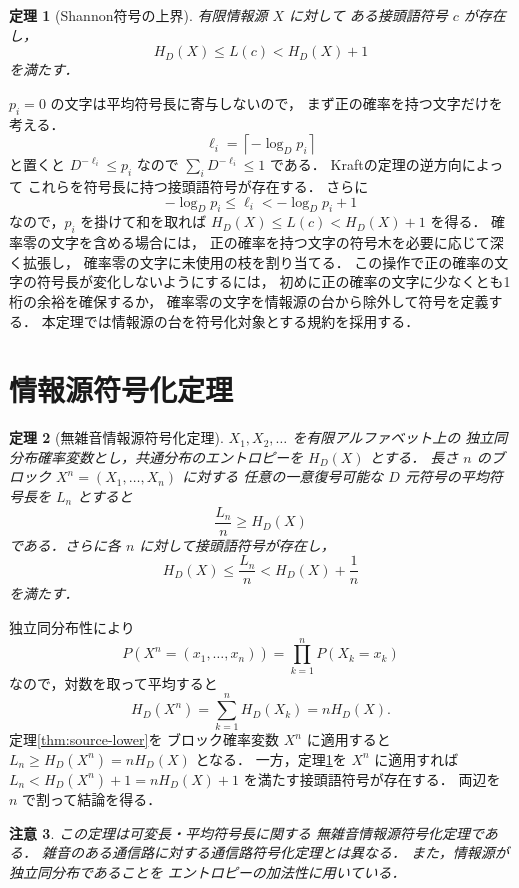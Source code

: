 \documentclass[a5paper,10pt,onecolumn]{jsarticle}
\makeatletter
\theoremstyle{mathnotetheorem}
\newtheorem{theorem}{定理}[section]
\newtheorem{remark}[theorem]{注意}
\renewcommand{\proofname}{証明}
\renewenvironment{proof}[1][\proofname]{%
  \par\pushQED{\qed}\normalfont\topsep4\p@\@plus2\p@\relax
  \trivlist\item[\hskip\labelsep\bfseries #1]\ignorespaces
}{\popQED\endtrivlist\@endpefalse}
\makeatother
\begin{document}
\begin{theorem}[Shannon符号の上界]\label{thm:shannon-upper}
有限情報源 $X$ に対して
ある接頭語符号 $c$ が存在し，
\[
 H_D(X)\le L(c)<H_D(X)+1
\]
を満たす．
\end{theorem}
\begin{proof}
$p_i=0$ の文字は平均符号長に寄与しないので，
まず正の確率を持つ文字だけを考える．
\[
 \ell_i=\left\lceil-\log_Dp_i\right\rceil
\]
と置くと
$D^{-\ell_i}\le p_i$ なので
$\sum_iD^{-\ell_i}\le1$ である．
Kraftの定理の逆方向によって
これらを符号長に持つ接頭語符号が存在する．
さらに
\[
 -\log_Dp_i\le\ell_i<-\log_Dp_i+1
\]
なので，$p_i$ を掛けて和を取れば
$H_D(X)\le L(c)<H_D(X)+1$ を得る．
確率零の文字を含める場合には，
正の確率を持つ文字の符号木を必要に応じて深く拡張し，
確率零の文字に未使用の枝を割り当てる．
この操作で正の確率の文字の符号長が変化しないようにするには，
初めに正の確率の文字に少なくとも1桁の余裕を確保するか，
確率零の文字を情報源の台から除外して符号を定義する．
本定理では情報源の台を符号化対象とする規約を採用する．
\end{proof}

\section{情報源符号化定理}

\begin{theorem}[無雑音情報源符号化定理]\label{thm:source-coding}
$X_1,X_2,\dots$ を有限アルファベット上の
独立同分布確率変数とし，共通分布のエントロピーを
$H_D(X)$ とする．
長さ $n$ のブロック $X^n=(X_1,\dots,X_n)$ に対する
任意の一意復号可能な $D$ 元符号の平均符号長を $L_n$ とすると
\[
 \frac{L_n}{n}\ge H_D(X)
\]
である．さらに各 $n$ に対して接頭語符号が存在し，
\[
 H_D(X)\le\frac{L_n}{n}
 <H_D(X)+\frac1n
\]
を満たす．
\end{theorem}
\begin{proof}
独立同分布性により
\[
 P(X^n=(x_1,\dots,x_n))=\prod_{k=1}^nP(X_k=x_k)
\]
なので，対数を取って平均すると
\[
 H_D(X^n)=\sum_{k=1}^nH_D(X_k)=nH_D(X).
\]
定理\ref{thm:source-lower}を
ブロック確率変数 $X^n$ に適用すると
$L_n\ge H_D(X^n)=nH_D(X)$ となる．
一方，定理\ref{thm:shannon-upper}を $X^n$ に適用すれば
$L_n<H_D(X^n)+1=nH_D(X)+1$
を満たす接頭語符号が存在する．
両辺を $n$ で割って結論を得る．
\end{proof}

\begin{remark}
この定理は可変長・平均符号長に関する
無雑音情報源符号化定理である．
雑音のある通信路に対する通信路符号化定理とは異なる．
また，情報源が独立同分布であることを
エントロピーの加法性に用いている．
\end{remark}
\end{document}
